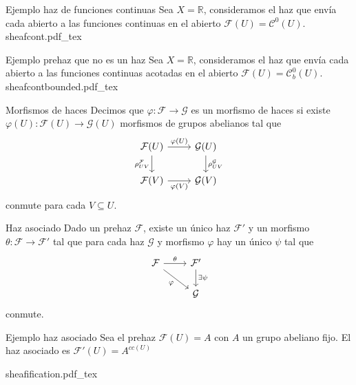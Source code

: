 \documentclass[10pt]{beamer}
\newcommand{\incfig}[1]{%
\center
\def\svgwidth{0.9\columnwidth}
{#1.pdf_tex}
}
\begin{document}
\begin{frame}[fragile]{Ejemplo haz de funciones continuas}
Sea $X = \mathbb{R}$, consideramos el haz que envía cada abierto a las funciones continuas en el abierto $\mathcal{F}(U) = \mathcal{C}^0(U)$.
\incfig{sheafcont}
\end{frame}


\begin{frame}[fragile]{Ejemplo prehaz que no es un haz}
Sea $X = \mathbb{R}$, consideramos el haz que envía cada abierto a las funciones continuas acotadas en el abierto $\mathcal{F}(U) = \mathcal{C}_b^0(U)$.
\incfig{sheafcontbounded}
\end{frame}


\begin{frame}[fragile]{Morfismos de haces}
Decimos que $\varphi : \mathcal{F} \to \mathcal{G}$ es un morfismo de haces si existe $\varphi (U): \mathcal{F}(U) \to \mathcal{G}(U)$  morfismos de grupos abelianos tal que
\[\begin{tikzcd}
	{\mathcal{F}(U)} & {\mathcal{G}(U)} \\
	{\mathcal{F}(V)} & {\mathcal{G}(V)}
	\arrow["{\varphi(U)}", from=1-1, to=1-2]
	\arrow["{\rho^\mathcal{F} _{UV}}"', from=1-1, to=2-1]
	\arrow["{\rho^\mathcal{G} _{UV}}", from=1-2, to=2-2]
	\arrow["{\varphi(V)}"', from=2-1, to=2-2]
\end{tikzcd}\]
conmute para cada $V \subseteq U$.
\end{frame}

\begin{frame}[fragile]{Haz asociado}
Dado un prehaz $\mathcal{F}$, existe un único haz $\mathcal{F}'$ y un morfismo $\theta: \mathcal{F} \to \mathcal{F}'$  tal que para cada haz $\mathcal{G} $ y morfismo $\varphi $ hay un único $\psi $ tal que
\[\begin{tikzcd}
	{\mathcal{F}} & {\mathcal{F}'} \\
	& {\mathcal{G}}
	\arrow["\theta", from=1-1, to=1-2]
	\arrow["\varphi"', from=1-1, to=2-2]
	\arrow["\exists \psi", from=1-2, to=2-2]
\end{tikzcd}\]
conmute.
\end{frame}

\begin{frame}[fragile]{Ejemplo haz asociado}
Sea el prehaz $\mathcal{F}(U) = A$ con $A$ un grupo abeliano fijo. El haz asociado es $\mathcal{F}'(U) = A^{c c(U)} $ 

\incfig{sheafification}

\end{frame}
\end{document}
